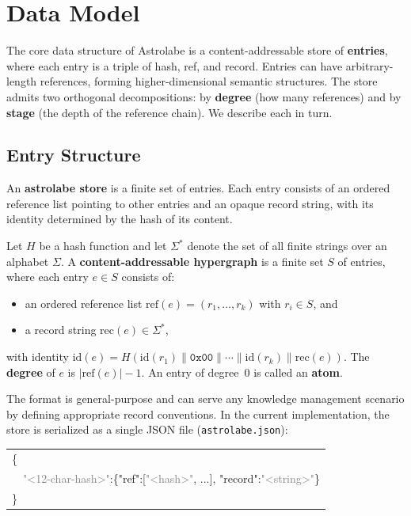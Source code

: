 \section{Data Model}
\label{sec:data-model}

The core data structure of Astrolabe is a content-addressable store of \textbf{entries}, where each entry is a triple of hash, ref, and record. Entries can have arbitrary-length references, forming higher-dimensional semantic structures. The store admits two orthogonal decompositions: by \textbf{degree} (how many references) and by \textbf{stage} (the depth of the reference chain). We describe each in turn.

\subsection{Entry Structure}

An \textbf{astrolabe store} is a finite set of entries. Each entry consists of an ordered reference list pointing to other entries and an opaque record string, with its identity determined by the hash of its content.

\begin{definition}
\label{def:cah}
Let $H$ be a hash function and let $\Sigma^*$ denote the set of all finite strings over an alphabet $\Sigma$. A \textbf{content-addressable hypergraph} is a finite set $S$ of entries, where each entry $e \in S$ consists of:
\begin{itemize}
  \item an ordered reference list $\mathrm{ref}(e) = (r_1, \ldots, r_k)$ with $r_i \in S$, and
  \item a record string $\mathrm{rec}(e) \in \Sigma^*$,
\end{itemize}
with identity $\mathrm{id}(e) = H(\mathrm{id}(r_1) \| \texttt{0x00} \| \cdots \| \mathrm{id}(r_k) \| \mathrm{rec}(e))$. The \textbf{degree} of $e$ is $|\mathrm{ref}(e)| - 1$. An entry of degree~0 is called an \textbf{atom}.
\end{definition}

The format is general-purpose and can serve any knowledge management scenario by defining appropriate record conventions. In the current implementation, the store is serialized as a single JSON file (\texttt{astrolabe.json}):

\medskip
{\small\ttfamily
\begin{tabular}{@{}l@{}}
\{\\
\ \ \textcolor{gray}{"<12-char-hash>"}:\{\textcolor{blue!70!black}{"ref"}:[\textcolor{gray}{"<hash>"}, ...], \textcolor{red!70!black}{"record"}:\textcolor{gray}{"<string>"}\}\\
\}
\end{tabular}
}
\medskip

